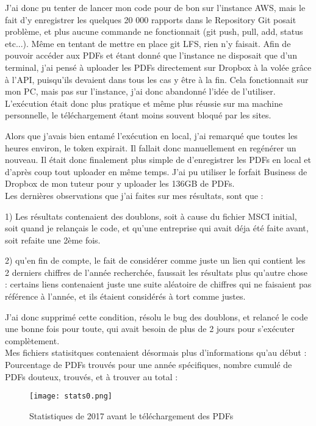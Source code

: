 J'ai donc pu tenter de lancer mon code pour de bon sur l'instance AWS, mais le fait d'y enregistrer les quelques 20 000 rapports dans le Repository Git posait problème, et plus aucune commande ne fonctionnait (git push, pull, add, status etc...).
Même en tentant de mettre en place git LFS, rien n'y faisait.
Afin de pouvoir accéder aux PDFs et étant donné que l'instance ne disposait que d'un terminal, j'ai pensé à uploader les PDFs directement sur Dropbox à la volée grâce à l'API, puisqu'ils devaient dans tous les cas y être à la fin.
Cela fonctionnait sur mon PC, mais pas sur l'instance, j'ai donc abandonné l'idée de l'utiliser. 
L'exécution était donc plus pratique et même plus réussie sur ma machine personnelle, le téléchargement étant moins souvent bloqué par les sites.

Alors que j'avais bien entamé l'exécution en local, j'ai remarqué que toutes les heures environ, le token expirait. Il fallait donc manuellement en regénérer un nouveau.
Il était donc finalement plus simple de d'enregistrer les PDFs en local et d'après coup tout uploader en même temps.
J'ai pu utiliser le forfait Business de Dropbox de mon tuteur pour y uploader les 136GB de PDFs.
\\

Les dernières observations que j'ai faites sur mes résultats, sont que :

1) Les résultats contenaient des doublons, soit à cause du fichier MSCI initial, soit quand je relançais le code, et qu'une entreprise qui avait déja été faite avant, soit refaite une 2ème fois.

2) qu'en fin de compte, le fait de considérer comme juste un lien qui contient les 2 derniers chiffres de l'année recherchée, faussait les résultats plus qu'autre chose :
certains liens contenaient juste une suite aléatoire de chiffres qui ne faisaient pas référence à l'année, et ils étaient considérés à tort comme justes.

J'ai donc supprimé cette condition, résolu le bug des doublons, et relancé le code une bonne fois pour toute, qui avait besoin de plus de 2 jours pour s'exécuter complètement.
\\

Mes fichiers statisitques contenaient désormais plus d'informations qu'au début : 
Pourcentage de PDFs trouvés pour une année spécifiques, nombre cumulé de PDFs douteux, trouvés, et à trouver au total :

\begin{figure}[H]
    \centering
    \texttt{[image: stats0.png]}
    \caption{Statistiques de 2017 avant le téléchargement des PDFs}
\end{figure}

